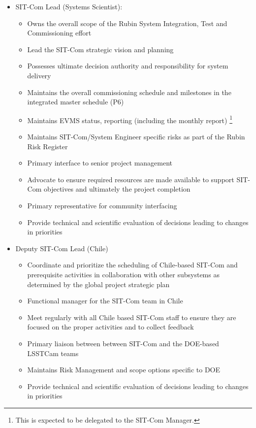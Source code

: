 \documentclass[SE,lsstdraft,authoryear,toc]{lsstdoc, lsstdraft}
\begin{document}
\begin{itemize}
    \item SIT-Com Lead (Systems Scientist):
    \begin{itemize}
        \item Owns the overall scope of the Rubin System Integration, Test and Commissioning effort
        \item Lead the SIT-Com strategic vision and planning
        \item Possesses ultimate decision authority and responsibility for system delivery
        \item Maintains the overall commissioning schedule and milestones in the integrated master schedule (P6)
        \item Maintains EVMS status, reporting (including the monthly report) \footnote{This is expected to be delegated to the SIT-Com Manager.}
        \item Maintains SIT-Com/System Engineer specific risks as part of the Rubin Risk Register
        \item Primary interface to senior project management
        \item Advocate to ensure required resources are made available to support SIT-Com objectives and ultimately the project completion
        \item Primary representative for community interfacing
        \item Provide technical and scientific evaluation of decisions leading to changes in priorities
    \end{itemize}
    \item Deputy SIT-Com Lead (Chile)
    \begin{itemize}
        \item Coordinate and prioritize the scheduling of Chile-based SIT-Com and prerequisite activities in collaboration with other subsystems as determined by the global project strategic plan
        \item Functional manager for the SIT-Com team in Chile
        \item Meet regularly with all Chile based SIT-Com staff to ensure they are focused on the proper activities and to collect feedback
        \item Primary liaison between between SIT-Com and the DOE-based LSSTCam teams
        \item Maintains Risk Management and scope options specific to DOE
        \item Provide technical and scientific evaluation of decisions leading to changes in priorities

\end{itemize}
\end{itemize}
\end{document}

